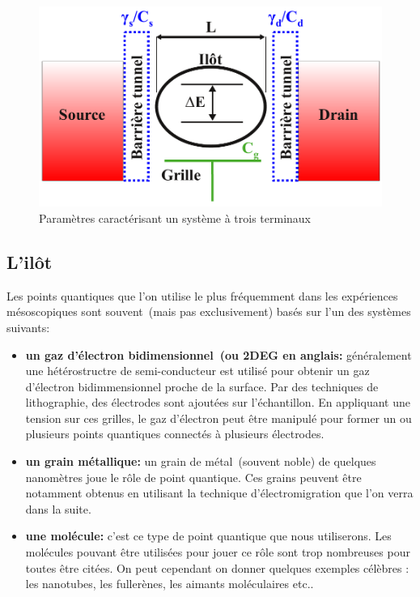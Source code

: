 \begin{figure}
\includegraphics[scale=1]{Theorie/Transport/figure1/figure1ThTr.pdf} 
\caption{Paramètres caractérisant un système à trois terminaux}
\label{description_systeme}
\end{figure}



\subsection{L'il\^ot}
Les points quantiques que l'on utilise le plus fréquemment dans les expériences mésoscopiques sont souvent~(mais pas exclusivement) basés sur l'un des systèmes suivants:
\begin{itemize}
\item \textbf{un gaz d'électron bidimensionnel~(ou 2DEG en anglais:} généralement une hétérostructre de semi-conducteur est utilisé pour obtenir un gaz d'électron bidimmensionnel proche de la surface. Par des techniques de lithographie, des électrodes sont ajoutées sur l'échantillon. En appliquant une tension sur ces grilles, le gaz d'électron peut \^etre manipulé pour former un ou plusieurs points quantiques connectés à plusieurs électrodes.
\item \textbf{un grain métallique:} un grain de métal~(souvent noble) de quelques nanomètres joue le rôle de point quantique. Ces grains peuvent \^etre notamment obtenus en utilisant la technique d'électromigration que l'on verra dans la suite.
\item \textbf{une molécule:} c'est ce type de point quantique que nous utiliserons. Les molécules pouvant \^etre utilisées pour jouer ce r\^ole sont trop nombreuses pour toutes \^etre citées. On peut cependant on donner quelques exemples célèbres : les nanotubes, les fullerènes, les aimants moléculaires etc.. \newline
\end{itemize}

